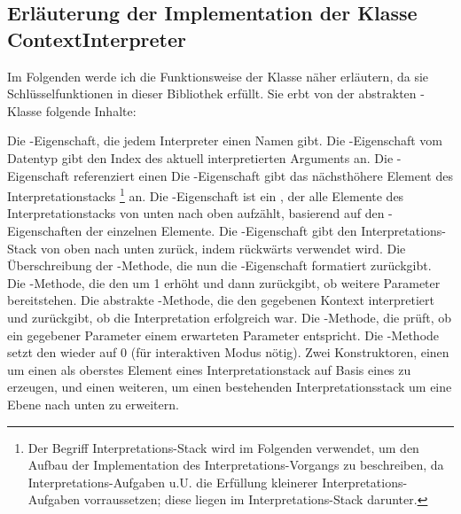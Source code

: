 \subsection{Erläuterung der Implementation der Klasse ContextInterpreter}\label{subsec:ContextInterpreter}
Im Folgenden werde ich die Funktionsweise der Klasse  näher erläutern, da sie Schlüsselfunktionen in dieser Bibliothek erfüllt.
Sie erbt von der abstrakten -Klasse folgende Inhalte:
\begin{outline}
 \1 Die -Eigenschaft, die jedem Interpreter einen Namen gibt.
 \1 Die -Eigenschaft vom Datentyp  gibt den Index des aktuell interpretierten Arguments an.
 \1 Die -Eigenschaft referenziert einen 
 \1 Die -Eigenschaft gibt das nächsthöhere Element des Interpretationstacks
 \footnote{Der Begriff Interpretations-Stack wird im Folgenden verwendet, um den Aufbau der Implementation des Interpretations-Vorgangs zu beschreiben, da Interpretations-Aufgaben u.U. die Erfüllung kleinerer Interpretations-Aufgaben vorraussetzen; diese liegen im Interpretations-Stack darunter.}
 an.%
 \1 Die -Eigenschaft ist ein , der alle Elemente des Interpretationstacks von unten nach oben aufzählt,
 basierend auf den -Eigenschaften der einzelnen Elemente.
 \1 Die -Eigenschaft gibt den Interpretations-Stack von oben nach unten zurück, indem  rückwärts verwendet wird.
 \1 Die Überschreibung der -Methode, die nun die -Eigenschaft formatiert zurückgibt.
 \1 Die -Methode, die den  um 1 erhöht und dann zurückgibt, ob weitere Parameter bereitstehen.
 \1 Die abstrakte -Methode, die den gegebenen Kontext interpretiert und zurückgibt, ob die Interpretation erfolgreich war.
 \1 Die -Methode, die prüft, ob ein gegebener Parameter einem erwarteten Parameter entspricht.
 \1 Die -Methode setzt den  wieder auf 0 (für interaktiven Modus nötig).
 \1 Zwei Konstruktoren, einen um einen  als oberstes Element eines Interpretationstack auf Basis eines  zu erzeugen, und einen weiteren, um einen bestehenden Interpretationsstack um eine Ebene nach unten zu erweitern.
\end{outline}
